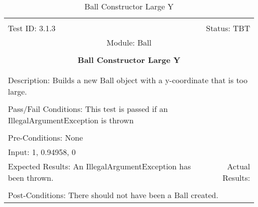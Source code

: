 \documentclass[titlepage]{article}
\begin{document}
\begin{center}%
\begin{table}[h!]
\begin{tabular}{|l r|}\hline&\\[-2mm]
	Test ID: 3.1.3	&Status: TBT\\[-3mm]
	\multicolumn{2}{|c|}{Module: Ball}\\&\\
	\multicolumn{2}{|c|}{\textbf{\large{Ball Constructor Large Y}}}\\&\\\hline&\\[-3mm]
	\multicolumn{2}{|p{\textwidth}|}{Description: Builds a new Ball object with a y-coordinate that is too large.}\\[1mm]\hline&\\[-3mm]
	\multicolumn{2}{|p{\textwidth}|}{Pass/Fail Conditions: This test is passed if an IllegalArgumentException is thrown}\\[1mm]\hline&\\[-3mm]
	\multicolumn{2}{|p{\textwidth}|}{Pre-Conditions: None}\\[4mm]
	\multicolumn{2}{|p{\textwidth}|}{Input: 1, 0.94958, 0}\\[2mm]\hline
	\multicolumn{1}{|p{0.49\textwidth}}{Expected Results: An IllegalArgumentException has been thrown.}	&\multicolumn{1}{|p{0.45\textwidth}|}{Actual Results:}\\\hline&\\[-3mm]
	\multicolumn{2}{|p{\textwidth}|}{Post-Conditions: There should not have been a Ball created.}\\\hline
\end{tabular}
\caption{Ball Constructor Large Y}
\end{table}
\end{center}
\newpage
\end{document}
